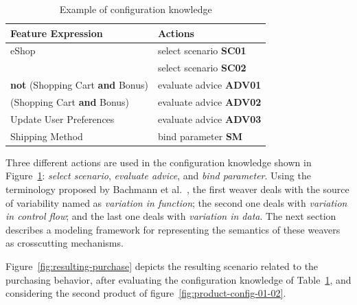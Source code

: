 \begin{table}[htb]
\begin{small}
\begin{tabular}{||lp{1.4in}||}
\hline
Feature Expression  						& Actions					 \\ \hline

eShop										& select scenario {\bf SC01} \\
											& select scenario {\bf SC02} \\	\hline 
{\bf not} (Shopping Cart {\bf and} Bonus) 	& evaluate advice {\bf ADV01} \\
\hline (Shopping Cart {\bf and} Bonus) 		& evaluate advice {\bf ADV02} 	\\
\hline Update User Preferences 				& evaluate advice {\bf ADV03} \\ \hline
Shipping Method								& bind parameter {\bf SM}\\ \hline
								
\end{tabular}
\end{small}
\caption{Example of configuration knowledge}
\label{tab:eshop-ck}
\end{table}

Three different actions are used in the configuration knowledge shown in
Figure~\ref{tab:eshop-ck}: \emph{select scenario},
\emph{evaluate advice}, and \emph{bind parameter}. Using the terminology
proposed by Bachmann et al.~\cite{Bachmann:2001aa}, the first weaver deals with
the source of variability named as \emph{variation in function}; the second one
deals with \emph{variation in control flow}; and the last one deals with
\emph{variation in data}. The next section describes a modeling framework 
for representing the semantics of these weavers as crosscutting mechanisms.

Figure~\ref{fig:resulting-purchase} depicts the resulting scenario related to
the purchasing behavior, after evaluating the configuration knowledge of
Table~\ref{tab:eshop-ck}, and considering the second product of
figure~\ref{fig:product-config-01-02}.


